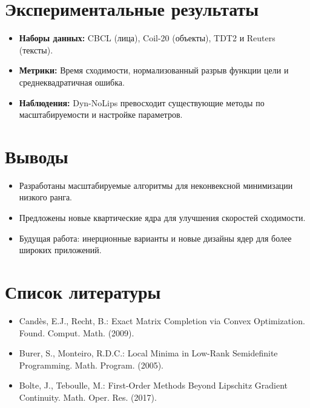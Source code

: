 \documentclass[a4paper,11pt]{article}
\begin{document}
\section{Экспериментальные результаты}
\begin{itemize}
    \item \textbf{Наборы данных:} CBCL (лица), Coil-20 (объекты), TDT2 и Reuters (тексты).
    \item \textbf{Метрики:} Время сходимости, нормализованный разрыв функции цели и среднеквадратичная ошибка.
    \item \textbf{Наблюдения:} Dyn-NoLips превосходит существующие методы по масштабируемости и настройке параметров.
\end{itemize}

\section{Выводы}
\begin{itemize}
    \item Разработаны масштабируемые алгоритмы для неконвексной минимизации низкого ранга.
    \item Предложены новые квартические ядра для улучшения скоростей сходимости.
    \item Будущая работа: инерционные варианты и новые дизайны ядер для более широких приложений.
\end{itemize}

\section*{Список литературы}
\begin{itemize}
    \item Cand\`es, E.J., Recht, B.: Exact Matrix Completion via Convex Optimization. Found. Comput. Math. (2009).
    \item Burer, S., Monteiro, R.D.C.: Local Minima in Low-Rank Semidefinite Programming. Math. Program. (2005).
    \item Bolte, J., Teboulle, M.: First-Order Methods Beyond Lipschitz Gradient Continuity. Math. Oper. Res. (2017).
\end{itemize}
\end{document}
